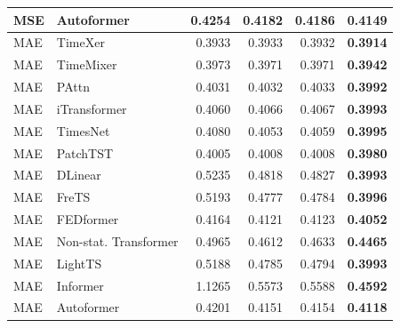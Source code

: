\begin{longtable}{llrrrr}
MSE & Autoformer & 0.4254 & 0.4182 & 0.4186 & \textbf{0.4149} \\
\midrule
MAE & TimeXer & 0.3933 & 0.3933 & 0.3932 & \textbf{0.3914} \\
MAE & TimeMixer & 0.3973 & 0.3971 & 0.3971 & \textbf{0.3942} \\
MAE & PAttn & 0.4031 & 0.4032 & 0.4033 & \textbf{0.3992} \\
MAE & iTransformer & 0.4060 & 0.4066 & 0.4067 & \textbf{0.3993} \\
MAE & TimesNet & 0.4080 & 0.4053 & 0.4059 & \textbf{0.3995} \\
MAE & PatchTST & 0.4005 & 0.4008 & 0.4008 & \textbf{0.3980} \\
MAE & DLinear & 0.5235 & 0.4818 & 0.4827 & \textbf{0.3993} \\
MAE & FreTS & 0.5193 & 0.4777 & 0.4784 & \textbf{0.3996} \\
MAE & FEDformer & 0.4164 & 0.4121 & 0.4123 & \textbf{0.4052} \\
MAE & Non-stat. Transformer & 0.4965 & 0.4612 & 0.4633 & \textbf{0.4465} \\
MAE & LightTS & 0.5188 & 0.4785 & 0.4794 & \textbf{0.3993} \\
MAE & Informer & 1.1265 & 0.5573 & 0.5588 & \textbf{0.4592} \\
MAE & Autoformer & 0.4201 & 0.4151 & 0.4154 & \textbf{0.4118} \\
\end{longtable}
\endgroup

